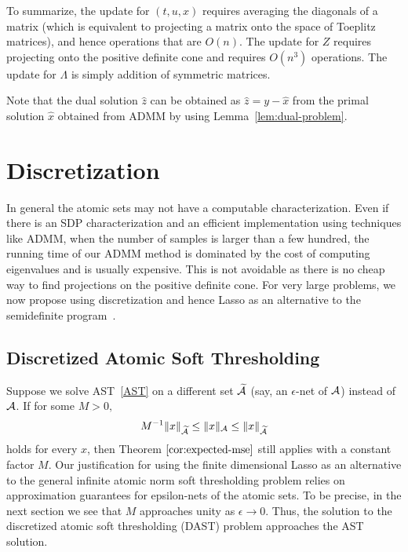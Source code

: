 To summarize, the update for $(t,u,x)$ requires averaging the diagonals of a
matrix (which is equivalent to projecting a matrix onto the space of Toeplitz
matrices), and hence operations that are $O(n)$. The update for $Z$ requires
projecting onto the positive definite cone and requires $O(n^3)$ operations. The
update for $\Lambda$ is simply addition of symmetric matrices.

Note that the dual solution $\hat{z}$ can be obtained as $\hat{z} = y - \hat{x}$
from the primal solution $\hat{x}$ obtained from ADMM by using
Lemma~\ref{lem:dual-problem}.

\section{Discretization} %
\label{sec:discretization}

In general the atomic sets may not have a computable characterization. Even if
there is an SDP characterization and an efficient implementation using
techniques like ADMM, when the number of samples is larger than a few hundred,
the running time of our ADMM method is dominated by the cost of computing
eigenvalues and is usually expensive. This is not avoidable as there is no cheap
way to find projections on the positive definite cone. For very large problems,
we now propose using discretization and hence Lasso as an alternative to the
semidefinite program~.

\subsection{Discretized Atomic Soft Thresholding} %
\label{sub:discretized_atomic_soft_thresholding}

Suppose we solve AST~\eqref{AST} on a different set $\widetilde{\mathcal{A}}$ (say, an
$\epsilon$-net of $\mathcal{A}$) instead of $\mathcal{A}$. If for some $M>0,$ \[
M^{-1}\lVert x\rVert_{\widetilde{\mathcal{A}}} \leq \lVert x\rVert_{\mathcal{A}} \leq
\lVert x\rVert_{\widetilde{\mathcal{A}}} \] holds for every $x$, then Theorem
$\ref{cor:expected-mse}$ still applies with a constant factor $M$. Our
justification for using the finite dimensional Lasso as an alternative to the
general infinite atomic norm soft thresholding problem relies on approximation
guarantees for epsilon-nets of the atomic sets. To be precise, in the next
section we see that $M$ approaches unity as $\epsilon \to 0.$ Thus, the solution
to the discretized atomic soft thresholding (DAST) problem approaches the AST
solution.

